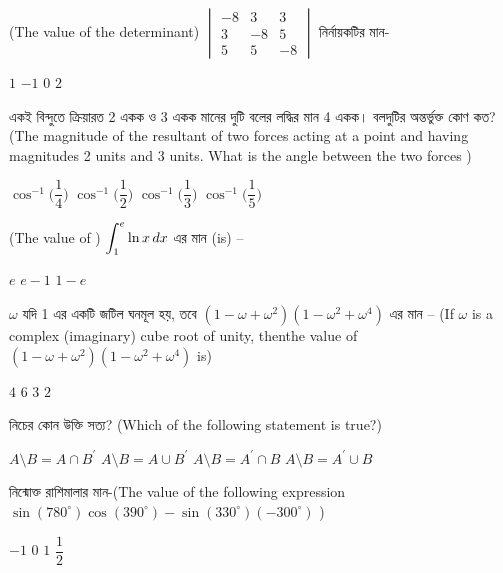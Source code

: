 \documentclass[addpoints]{exam}
\begin{document}
\begin{questions}
\begin{oneparchoices}
 
\end{oneparchoices}

\question (The value of the determinant) $ \begin{vmatrix}
-8 & 3 & 3\\
3 & -8 & 5\\
5 & 5 & -8
\end{vmatrix} $ নির্নায়কটির মান- 

\begin{oneparchoices}
\choice $ 1 $
\choice $ -1 $
\choice $ 0 $
\choice $ 2 $
\end{oneparchoices}

\question একই বিন্দুতে ক্রিয়ারত 2 একক ও 3 একক মানের দুটি বলের লদ্ধির মান 4 একক। বলদুটির অন্তর্ভুক্ত কোণ কত? (The magnitude of the resultant of two forces acting at a point and having magnitudes 2 units and 3 units. What is the angle between the two forces )

\begin{oneparchoices}
\choice $ \cos^{-1}\Big(\dfrac{1}{4} \Big) $
\choice $ \cos^{-1}\Big(\dfrac{1}{2} \Big) $
\choice $ \cos^{-1}\Big(\dfrac{1}{3} \Big) $
\choice $ \cos^{-1}\Big(\dfrac{1}{5} \Big) $
\end{oneparchoices}

\question  (The value of )  $ \mathlarger{\int_{1}^{e}\ln x\, dx} $ এর  মান (is) – 

\begin{oneparchoices}
\choice  $ e $
\choice  $ e-1 $
\choice  $ 1-e $
\end{oneparchoices}

\question $ \omega $ যদি 1 এর একটি জটিল ঘনমূল হয়, তবে $ (1-\omega +\omega^{2})(1-\omega^{2}+\omega^{4}) $ এর মান – (If $ \omega $ is a complex (imaginary) cube root of unity, thenthe value of $ (1-\omega +\omega^{2})(1-\omega^{2}+\omega^{4}) $ is)
 
\begin{oneparchoices}
\choice $ 4 $
\choice $ 6 $
\choice $ 3 $
\choice $ 2 $
\end{oneparchoices}

\question  নিচের কোন উক্তি সত্য?  (Which of the following statement is true?)

\begin{oneparchoices}
\choice  $ A\setminus B = A\cap B^{\prime} $
\choice  $ A\setminus B = A\cup B^{\prime} $
\choice  $ A\setminus B = A^{\prime}\cap B $
\choice  $ A\setminus B = A^{\prime}\cup B $
\end{oneparchoices}

\question  নিন্মোক্ত রাশিমালার মান-(The value of the following expression $ \sin (780^{\circ})\cos (390^{\circ})-\sin (330^{\circ}) (-300^{\circ})$ )  

\begin{oneparchoices}
\choice $ -1 $
\choice $ 0 $
\choice $ 1 $
\choice $ \dfrac{1}{2} $
\end{oneparchoices}

\end{questions}
\end{document}
